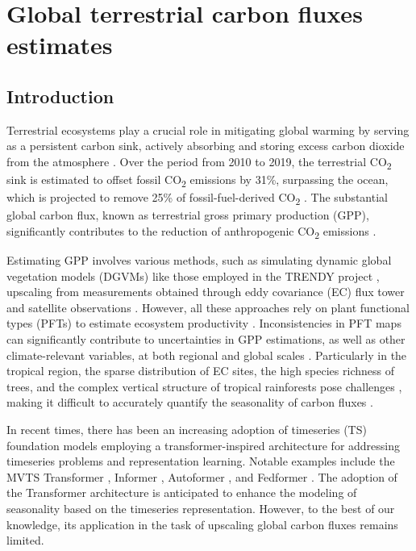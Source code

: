 \section{Global terrestrial carbon fluxes estimates} \label{chap4_s2}

\subsection{Introduction}
Terrestrial ecosystems play a crucial role in mitigating global warming by serving as a persistent carbon sink, actively absorbing and storing excess carbon dioxide from the atmosphere \citep{pan2011large}. Over the period from 2010 to 2019, the terrestrial CO\textsubscript{2} sink is estimated to offset fossil CO\textsubscript{2} emissions by 31\%, surpassing the ocean, which is projected to remove 25\% of fossil-fuel-derived CO\textsubscript{2} \citep{essd-15-5301-2023}. The substantial global carbon flux, known as terrestrial gross primary production (GPP), significantly contributes to the reduction of anthropogenic CO\textsubscript{2} emissions \citep{beer2010terrestrial}. \par

Estimating GPP involves various methods, such as simulating dynamic global vegetation models (DGVMs) like those employed in the TRENDY project \citep{sitch2015recent, le2018global}, upscaling from measurements obtained through eddy covariance (EC) flux tower and satellite observations \citep{jung2019fluxcom, zeng2020global}. However, all these approaches rely on plant functional types (PFTs) to estimate ecosystem productivity \citep{poulter2011plant, poulter2015plant, lin2021improved, guo2023estimating, yan2023integrating}. Inconsistencies in PFT maps can significantly contribute to uncertainties in GPP estimations, as well as other climate-relevant variables, at both regional and global scales \citep{poulter2011plant}. Particularly in the tropical region, the sparse distribution of EC sites, the high species richness of trees, and the complex vertical structure of tropical rainforests pose challenges \citep{montgomery2001forest}, making it difficult to accurately quantify the seasonality of carbon fluxes \citep{xu2015satellite}. \par

In recent times, there has been an increasing adoption of timeseries (TS) foundation models employing a transformer-inspired architecture for addressing timeseries problems and representation learning. Notable examples include the MVTS Transformer \citep{zerveas2021transformer}, Informer \citep{zhou2021informer}, Autoformer \citep{wu2021autoformer}, and Fedformer \citep{zhou2022fedformer}. The adoption of the Transformer architecture is anticipated to enhance the modeling of seasonality based on the timeseries representation. However, to the best of our knowledge, its application in the task of upscaling global carbon fluxes remains limited. \par

